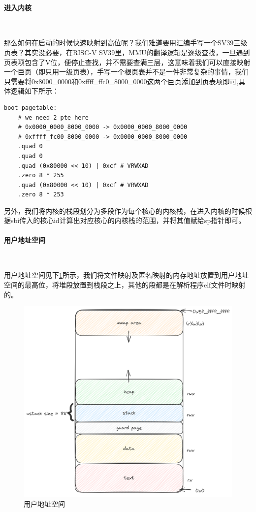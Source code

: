 \paragraph{进入内核}~{}

那么如何在启动的时候快速映射到高位呢？我们难道要用汇编手写一个SV39三级页表？其实没必要，在RISC-V SV39里，MMU的翻译逻辑是逐级查找，一旦遇到页表项包含了V位，便停止查找，并不需要查满三层，这意味着我们可以直接映射一个巨页（即只用一级页表），手写一个根页表并不是一件非常复杂的事情，我们只需要将0x8000\_0000和0xffff\_ffc0\_8000\_0000这两个巨页添加到页表项即可,具体逻辑如下所示：
\begin{tcolorbox}[title=\textbf{os/src/entry.S}]
\begin{verbatim}
boot_pagetable:
    # we need 2 pte here
    # 0x0000_0000_8000_0000 -> 0x0000_0000_8000_0000
    # 0xffff_fc00_8000_0000 -> 0x0000_0000_8000_0000
    .quad 0
    .quad 0
    .quad (0x80000 << 10) | 0xcf # VRWXAD
    .zero 8 * 255
    .quad (0x80000 << 10) | 0xcf # VRWXAD
    .zero 8 * 253
\end{verbatim}
\end{tcolorbox}

另外，我们将内核的栈段划分为多段作为每个核心的内核栈，在进入内核的时候根据sbi传入的核心id计算出对应核心的内核栈的范围，并将其值赋给sp指针即可。

\paragraph{用户地址空间}~{}

用户地址空间见下\cref{pic:user_mem}所示，我们将文件映射及匿名映射的内存地址放置到用户地址空间的最高位，将堆段放置到栈段之上，其他的段都是在解析程序elf文件时映射的。

\begin{figure}[hbt]
    \centering
    \includegraphics[width=.8\linewidth]{figure/user_mem.png}
    \caption{用户地址空间}
    \label{pic:user_mem}
\end{figure}

